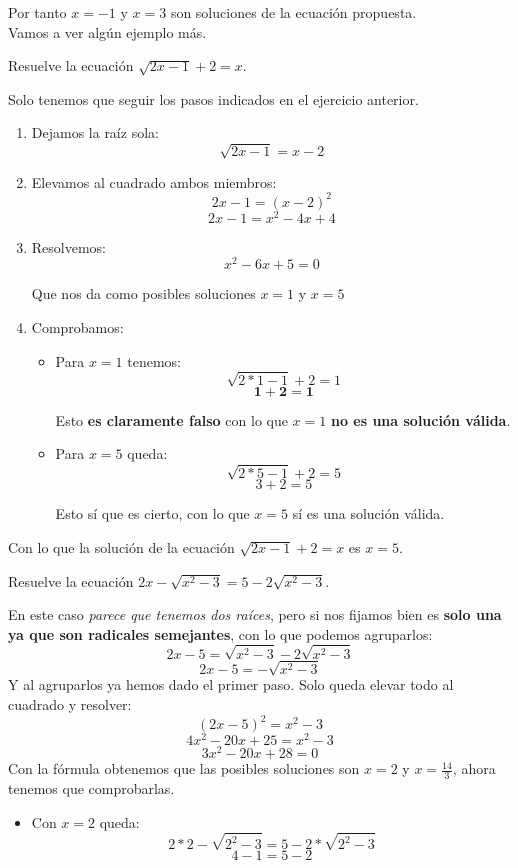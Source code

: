 \documentclass[a4paper,11pt,answers]{exam}
\begin{document}
Por tanto $x = -1$ y $x = 3$ son soluciones de la ecuación propuesta.\\

Vamos a ver algún ejemplo más.\\
\begin{questions}
\question Resuelve la ecuación $\sqrt{2x -1} + 2 = x$.
  \begin{solution}
    Solo tenemos que seguir los pasos indicados en el ejercicio anterior.
    \begin{enumerate}
    \item Dejamos la raíz sola:
      \[\sqrt{2x - 1} = x - 2\]
    \item Elevamos al cuadrado ambos miembros:
      \[2x - 1 = (x- 2)^2 \]
      \[2x - 1 = x^2 - 4x + 4\]
    \item Resolvemos:
      \[x^2 - 6x + 5 = 0\]

      Que nos da como posibles soluciones $x = 1$ y $x = 5$
    \item Comprobamos:
      \begin{itemize}
      \item Para $x = 1$ tenemos:
        \[\sqrt{2*1 - 1} + 2 = 1\]
        \[\boldsymbol{1 + 2 = 1}\]

        Esto \textbf{es claramente falso} con lo que $x = 1$ \textbf{no es una solución válida}.
      \item Para $x = 5$ queda:
        \[\sqrt{2*5 - 1} + 2 = 5\]
        \[3 + 2 = 5\]

        Esto sí que es cierto, con lo que $x = 5$ sí es una solución válida.
      \end{itemize}
    \end{enumerate}

    Con lo que la solución de la ecuación $\sqrt{2x -1} + 2 = x$ es $x = 5$.
  \end{solution}
\question Resuelve la ecuación $2x - \sqrt{x^2 -3} = 5 - 2\sqrt{x^2 - 3}$.
  \begin{solution}
    En este caso \emph{parece que tenemos dos raíces}, pero si nos fijamos bien es \textbf{solo una ya que son radicales semejantes}, con lo que podemos agruparlos:
    \[2x -5 = \sqrt{x^2 - 3} -2\sqrt{x^2 - 3}\]
    \[2x -5 = -\sqrt{x^2 - 3}\]
    Y al agruparlos ya hemos dado el primer paso. Solo queda elevar todo al cuadrado y resolver:
    \[(2x-5)^2 = x^2 - 3\]
    \[4x^2 - 20x +25 = x^2 - 3\]
    \[3x^2 - 20x + 28 = 0\]
    Con la fórmula obtenemos que las posibles soluciones son $x = 2$ y $x = \frac{14}{3}$, ahora
    tenemos que comprobarlas.
    \begin{itemize}
    \item Con $x = 2$ queda:
      \[2*2 - \sqrt{2^2 - 3} = 5 - 2*\sqrt{2^2 - 3}\]
      \[4 - 1 = 5 - 2\]


\end{itemize}
\end{solution}
\end{questions}
\end{document}
